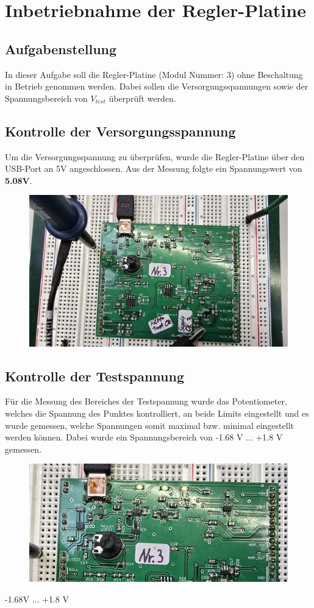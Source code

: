 \documentclass[twoside]{article}
\begin{document}
\tableofcontents
\newpage

\section{Inbetriebnahme der Regler-Platine}
\subsection{Aufgabenstellung}
In dieser Aufgabe soll die Regler-Platine (Modul Nummer: 3) ohne Beschaltung in Betrieb genommen werden. Dabei sollen die Versorgungsspannungen sowie der Spannungsbereich von $V_{test}$ überprüft werden.

\subsection{Kontrolle der Versorgungsspannung}
Um die Versorgungsspannung zu überprüfen, wurde die Regler-Platine über den USB-Port an 5V angeschlossen. Aus der Messung folgte ein Spannungswert von \textbf{5.08V}.
\begin{figure}[h]
    \centering
    \includegraphics[width=0.75\linewidth]{img/Aufbau_01.jpg}
\end{figure}

\subsection{Kontrolle der Testspannung}
Für die Messung des Bereiches der Testspannung wurde das Potentiometer, welches die Spannung des Punktes kontrolliert, an beide Limits eingestellt und es wurde gemessen, welche Spannungen somit maximal bzw. minimal eingestellt werden können. Dabei wurde ein Spannungsbereich von -1.68 V ... +1.8 V gemessen.
\begin{figure}[h]
    \centering
    \includegraphics[width=0.75\linewidth]{img/Aufbau_02.jpg}
\end{figure}
-1.68V ... +1.8 V
\end{document}
